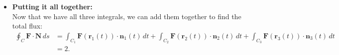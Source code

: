 \documentclass[11pt]{article}
\newcommand{\mb}[1]{\mathbf{#1}}
\begin{document}
\begin{enumerate}
{\begin{itemize}
\begin{align*}
                &= \frac{4}{3} - \frac{4}{3} = 0.
            \end{align*}
            \item \textbf{Putting it all together:} \\
            Now that we have all three integrals, we can add them together to find the total flux:
            \begin{align*}
                \oint_{C} \mb{F} \cdot \mb{N} \, ds &= \int_{C_{1}} \mb{F}(\mb{r}_{1}(t)) \cdot \mb{n}_{1}(t) \, dt + \int_{C_{2}} \mb{F}(\mb{r}_{2}(t)) \cdot \mb{n}_{2}(t) \, dt + \int_{C_{3}} \mb{F}(\mb{r}_{3}(t)) \cdot \mb{n}_{3}(t) \, dt \\
                &= \boxed{2}.
            \end{align*}
        \end{itemize}
    }
\end{enumerate}
\end{document}
